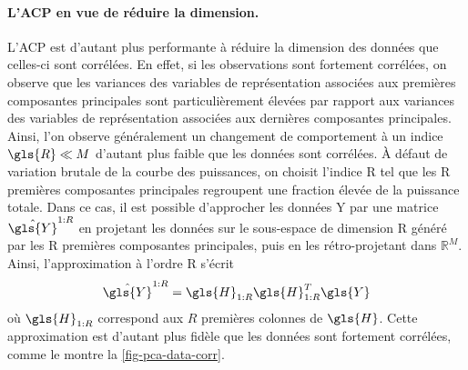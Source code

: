     \paragraph{L'ACP en vue de réduire la dimension.} L'ACP est d'autant plus performante à réduire la dimension des données que celles-ci sont corrélées. En effet, si les observations sont fortement corrélées, on observe que les variances des variables de représentation associées aux premières composantes principales sont particulièrement élevées par rapport aux variances des variables de représentation associées aux dernières composantes principales.
    Ainsi, l'on observe généralement un changement de comportement à un indice $\gls{R}\ll M$ d'autant plus faible que les données sont corrélées. \`A défaut de variation brutale de la courbe des puissances, on choisit l'indice \gls{R} tel que les \gls{R} premières composantes principales regroupent une fraction élevée de la puissance totale.
    Dans ce cas, il est possible d'approcher les données \gls{Y} par une matrice $\hat{\gls{Y}}^{1:R}$ en projetant les données sur le sous-espace de dimension \gls{R} généré par les \gls{R} premières composantes principales, puis en les rétro-projetant dans $\mathbb{R}^M$. Ainsi, l'approximation à l'ordre \gls{R} s'écrit
    \begin{equation}
    \hat{\gls{Y}}^{1:R} = \gls{H}_{1:R}\gls{H}_{1:R}^T\gls{Y}
    \end{equation}
    où $\gls{H}_{1:R}$ correspond aux $R$ premières colonnes de $\gls{H}$. Cette approximation est d'autant plus fidèle que les données sont fortement corrélées, comme le montre la \cref{fig-pca-data-corr}.

